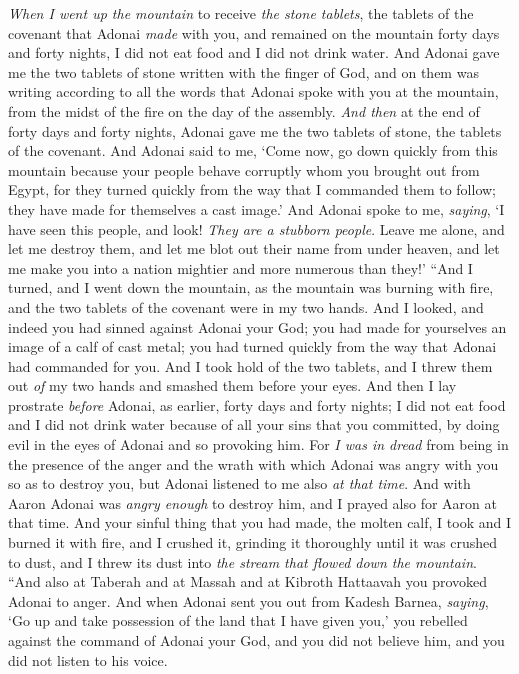 \begin{biblechapter}
\verse \textit{When I went up the mountain} to receive \textit{the stone tablets}, the tablets of the covenant that Adonai \textit{made} with you, and remained on the mountain forty days and forty nights, I did not eat food and I did not drink water.
\verse And Adonai gave me the two tablets of stone written with the finger of God, and on them was writing according to all the words that Adonai spoke with you at the mountain, from the midst of the fire on the day of the assembly.
\verse \textit{And then} at the end of forty days and forty nights, Adonai gave me the two tablets of stone, the tablets of the covenant.
\verse And Adonai said to me, ‘Come now, go down quickly from this mountain because your people behave corruptly whom you brought out from Egypt, for they turned quickly from the way that I commanded them to follow; they have made for themselves a cast image.’
\verse And Adonai spoke to me, \textit{saying}, ‘I have seen this people, and look! \textit{They are a stubborn people}.
\verse Leave me alone, and let me destroy them, and let me blot out their name from under heaven, and let me make you into a nation mightier and more numerous than they!’
\verse “And I turned, and I went down the mountain, as the mountain was burning with fire, and the two tablets of the covenant were in my two hands.
\verse And I looked, and indeed you had sinned against Adonai your God; you had made for yourselves an image of a calf of cast metal;  you had turned quickly from the way that Adonai had commanded for you.
\verse And I took hold of the two tablets, and I threw them out \textit{of} my two hands and smashed them before your eyes.
\verse And then I lay prostrate \textit{before} Adonai, as earlier, forty days and forty nights; I did not eat food and I did not drink water because of all your sins that you committed, by doing evil in the eyes of Adonai and so provoking him.
\verse For \textit{I was in dread} from being in the presence of the anger and the wrath with which Adonai was angry with you so as to destroy you, but Adonai listened to me also \textit{at that time}.
\verse And with Aaron Adonai was \textit{angry enough} to destroy him, and I prayed also for Aaron at that time.
\verse And your sinful thing that you had made, the molten calf, I took and I burned it with fire, and I crushed it, grinding it thoroughly until it was crushed to dust, and I threw its dust into \textit{the stream that flowed down the mountain}.
\verse “And also at Taberah and at Massah and at Kibroth Hattaavah you provoked Adonai to anger.
\verse And when Adonai sent you out from Kadesh Barnea, \textit{saying}, ‘Go up and take possession of the land that I have given you,’ you rebelled against the command of Adonai your God, and you did not believe him, and you did not listen to his voice.

\end{biblechapter}
